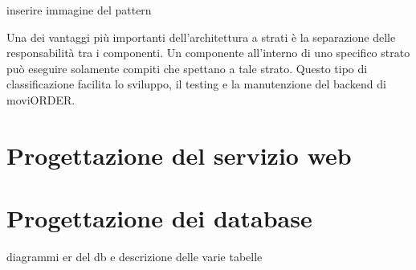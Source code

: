inserire immagine del pattern

Una dei vantaggi più importanti dell'architettura a strati è la separazione delle responsabilità tra i componenti. Un componente all'interno di uno specifico strato può eseguire solamente compiti che spettano a tale strato. Questo tipo di classificazione facilita lo sviluppo, il testing e la manutenzione del backend di moviORDER.

\section{Progettazione del servizio web}



\section{Progettazione dei database}

diagrammi er del db e descrizione delle varie tabelle

